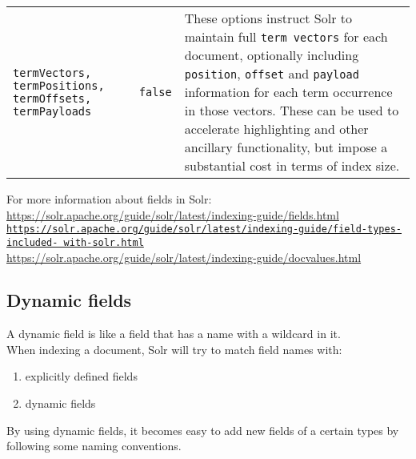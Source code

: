 \begin{longtable}{| p{2.5cm} p{1.5cm} p{9cm} |}
	
	
	\texttt{termVectors, termPositions, termOffsets, termPayloads}
	&
	\newline
	\texttt{false}
	&
	These options instruct Solr to maintain full \texttt{term vectors} for
	each document, optionally including \texttt{position}, \texttt{offset} and	\texttt{payload} information for each term occurrence in those vectors. \newline
	\newline
	These can be used to accelerate highlighting and other ancillary functionality, but impose a substantial cost in terms of index size. \newline
	\\
\end{longtable}

\bigskip

For more information about fields in Solr: \\

\url{https://solr.apache.org/guide/solr/latest/indexing-guide/fields.html} \\


\href{https://solr.apache.org/guide/solr/latest/indexing-guide/field-types-included-with-solr.html}{\texttt{https://solr.apache.org/guide/solr/latest/indexing-guide/field-types-included-\newline
with-solr.html}} \\

\url{https://solr.apache.org/guide/solr/latest/indexing-guide/docvalues.html}



\bigskip
\bigskip
\bigskip

\subsection{Dynamic fields} \label{dynamic-fields}

A dynamic field is like a field that has a name with a wildcard in it. \\

When indexing a document, Solr will try to match field names with:
\begin{enumerate}
	\item explicitly defined fields
	\item dynamic fields
\end{enumerate}

\bigskip

By using dynamic fields, it becomes easy to add new fields of a certain types by following some naming conventions. \\

